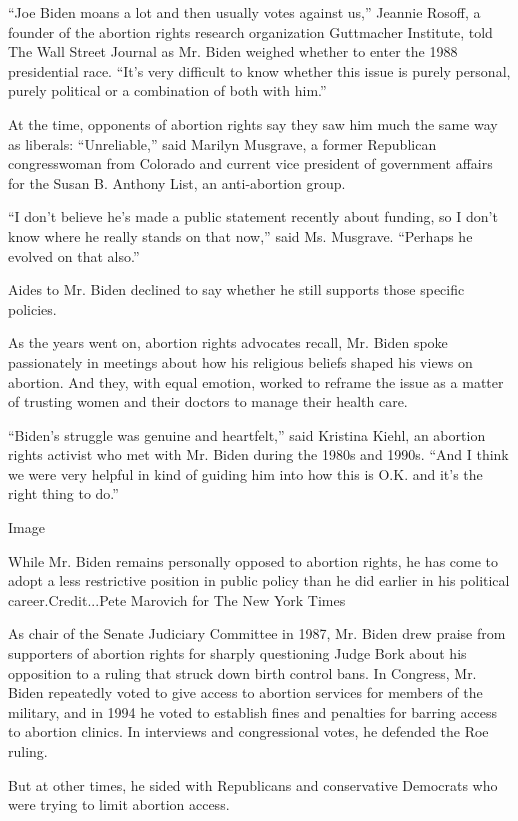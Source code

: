 ``Joe Biden moans a lot and then usually votes against us,'' Jeannie
Rosoff, a founder of the abortion rights research organization
Guttmacher Institute, told The Wall Street Journal as Mr. Biden weighed
whether to enter the 1988 presidential race. ``It's very difficult to
know whether this issue is purely personal, purely political or a
combination of both with him.''

At the time, opponents of abortion rights say they saw him much the same
way as liberals: ``Unreliable,'' said Marilyn Musgrave, a former
Republican congresswoman from Colorado and current vice president of
government affairs for the Susan B. Anthony List, an anti-abortion
group.

``I don't believe he's made a public statement recently about funding,
so I don't know where he really stands on that now,'' said Ms. Musgrave.
``Perhaps he evolved on that also.''

Aides to Mr. Biden declined to say whether he still supports those
specific policies.

As the years went on, abortion rights advocates recall, Mr. Biden spoke
passionately in meetings about how his religious beliefs shaped his
views on abortion. And they, with equal emotion, worked to reframe the
issue as a matter of trusting women and their doctors to manage their
health care.

``Biden's struggle was genuine and heartfelt,'' said Kristina Kiehl, an
abortion rights activist who met with Mr. Biden during the 1980s and
1990s. ``And I think we were very helpful in kind of guiding him into
how this is O.K. and it's the right thing to do.''

Image

While Mr. Biden remains personally opposed to abortion rights, he has
come to adopt a less restrictive position in public policy than he did
earlier in his political career.Credit...Pete Marovich for The New York
Times

As chair of the Senate Judiciary Committee in 1987, Mr. Biden drew
praise from supporters of abortion rights for sharply questioning Judge
Bork about his opposition to a ruling that struck down birth control
bans. In Congress, Mr. Biden repeatedly voted to give access to abortion
services for members of the military, and in 1994 he voted to establish
fines and penalties for barring access to abortion clinics. In
interviews and congressional votes, he defended the Roe ruling.

But at other times, he sided with Republicans and conservative Democrats
who were trying to limit abortion access.


